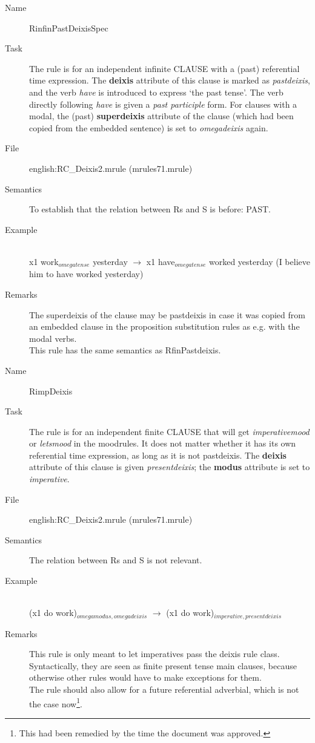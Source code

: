 \begin{description}
\vspace{1 cm}
\begin{description}
\item[Name]   RinfinPastDeixisSpec
\item[Task] The rule is for an independent infinite CLAUSE with a (past)
referential time expression. The {\bf deixis} attribute of this clause
is marked as {\em pastdeixis\/}, and the verb {\em have\/} is introduced to 
express `the past tense'. The verb directly following {\em have\/} is given a 
{\em past participle\/} form. 
For clauses with a modal, the (past) {\bf superdeixis}
attribute of the clause (which had been copied from the embedded sentence) is 
set to {\em omegadeixis\/} again. 
\item[File] english:RC\_Deixis2.mrule (mrules71.mrule)
\item[Semantics] To establish that the relation between Rs and S is 
before: PAST. 
\item[Example] \mbox{}\\
x1 work$_{omegatense}$ yesterday $\rightarrow$ x1 have$_{omegatense}$ 
worked yesterday  (I believe him to have worked yesterday)
\item[Remarks] 
The superdeixis of the clause may be pastdeixis in 
case it was copied from an embedded clause in the proposition substitution 
rules as e.g. with the modal verbs. \\
This rule has the same semantics as RfinPastdeixis.
\end{description}

\vspace{1 cm}
\begin{description}
\item[Name] RimpDeixis
\item[Task] The rule is for an independent finite CLAUSE that will get {\em 
imperativemood\/} or {\em letsmood\/} in the moodrules. It does not matter 
whether it has its own 
referential time expression, as long as it is not pastdeixis. 
The {\bf deixis} attribute of this clause is given {\em presentdeixis\/}; 
the {\bf modus} attribute is set to {\em imperative\/}.
\item[File] english:RC\_Deixis2.mrule (mrules71.mrule)
\item[Semantics] The relation between Rs and S is not relevant.
\item[Example] \mbox{}\\
(x1 do work)$_{omegamodus, omegadeixis}$ $\rightarrow$ (x1 do 
work)$_{imperative, presentdeixis}$
\item[Remarks] This rule is only meant to let imperatives pass the deixis rule 
class. Syntactically, they are seen as finite present tense main clauses, 
because otherwise other rules would have to make exceptions for them.\\
The rule should also allow for a future referential adverbial, which is not the 
case now\footnote{This had been remedied by the time the document was 
approved.}.
\end{description}


\end{description}
